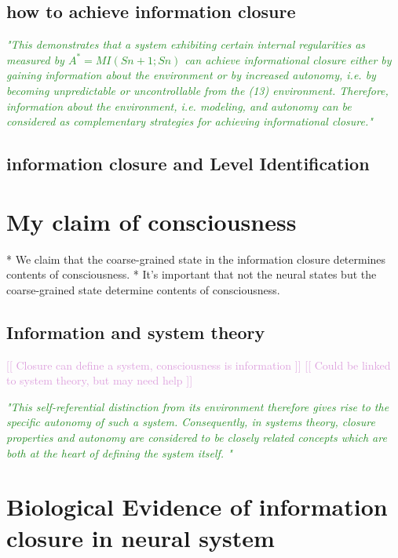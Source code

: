 \documentclass[utf8]{frontiersSCNS}
\newcommand{\rewrite}[1]{\textcolor{ForestGreen}{\textit{"#1"}}}
\newcommand{\temp}[1]{\textcolor{Plum}{[[ #1 ]]\newline}}
\begin{document}
	
	\subsection{how to achieve information closure}
	\rewrite{This demonstrates that a system exhibiting certain internal regularities as measured by $A^* = MI(Sn+1; Sn)$ can achieve informational closure either by gaining information about the environment or by increased autonomy, i.e. by becoming unpredictable or uncontrollable from the
		(13) environment. Therefore, information about the environment, i.e. modeling, and autonomy can be considered as complementary strategies for achieving informational closure.}
	
	\subsection{information closure and Level Identification}	

	
	
\section{My claim of consciousness}
	* We claim that the coarse-grained state in the information closure determines contents of consciousness. 
	* It's important that not the neural states but the coarse-grained state determine contents of consciousness. 
	
	
	\subsection{Information and system theory}
		\temp{Closure can define a system, consciousness is information}
		\temp{Could be linked to system theory, but may need help}
		
		\rewrite{This self-referential distinction from its environment therefore gives rise to the specific autonomy of such a system. Consequently, in systems theory, closure properties and autonomy are considered to be closely related concepts which are both at the heart of defining the system itself.
		}
	

\section{Biological Evidence of information closure in neural system}
\end{document}
